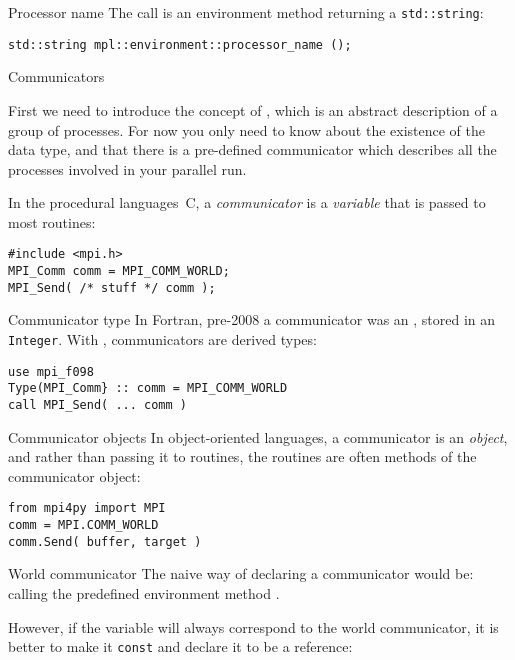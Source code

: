 \begin{mplnote}{Processor name}
  The  call is an environment method
  returning a \lstinline{std::string}:
\begin{lstlisting}
std::string mpl::environment::processor_name ();
\end{lstlisting}
\end{mplnote}

 {Communicators}

First we need to introduce the concept of
, which is an abstract description of a
group of processes. For now you only need to know about the existence
of the  data type, and that there is a
pre-defined communicator  which
describes all the processes involved in your parallel run.


In the procedural languages~C,
a \emph{communicator} is a \emph{variable}
that is passed to most routines:
\begin{lstlisting}
#include <mpi.h>
MPI_Comm comm = MPI_COMM_WORLD;
MPI_Send( /* stuff */ comm );
\end{lstlisting}

\begin{fortrannote}{Communicator type}
  In Fortran, pre-2008 a communicator was an ,
  stored in an \lstinline{Integer}. With ,
  communicators are derived types:
\begin{lstlisting}
use mpi_f098
Type(MPI_Comm} :: comm = MPI_COMM_WORLD
call MPI_Send( ... comm )
\end{lstlisting}
\end{fortrannote}

\begin{pythonnote}{Communicator objects}
In object-oriented languages, a communicator is an
\emph{object},
and rather than passing it to routines,
the routines are often methods of the communicator object:
\begin{lstlisting}
from mpi4py import MPI
comm = MPI.COMM_WORLD
comm.Send( buffer, target )
\end{lstlisting}
\end{pythonnote}

\begin{mplnote}{World communicator}
  The naive way of declaring a communicator would be:
  calling the predefined environment method .

  However, if the variable will always correspond to the world communicator,
  it is better to make it \lstinline{const} and declare it to be a reference:
\end{mplnote}

